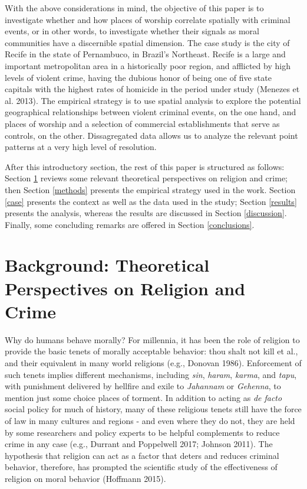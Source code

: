 \documentclass[smallextended]{svjour3}       %
\begin{document}
With the above considerations in mind, the objective of this paper is to
investigate whether and how places of worship correlate spatially with
criminal events, or in other words, to investigate whether their signals
as moral communities have a discernible spatial dimension. The case
study is the city of Recife in the state of Pernambuco, in Brazil's
Northeast. Recife is a large and important metropolitan area in a
historically poor region, and afflicted by high levels of violent crime,
having the dubious honor of being one of five state capitals with the
highest rates of homicide in the period under study (Menezes et al.
2013). The empirical strategy is to use spatial analysis to explore the
potential geographical relationships between violent criminal events, on
the one hand, and places of worship and a selection of commercial
establishments that serve as controls, on the other. Dissagregated data
allows us to analyze the relevant point patterns at a very high level of
resolution.

After this introductory section, the rest of this paper is structured as
follows: Section \ref{background} reviews some relevant theoretical
perspectives on religion and crime; then Section \ref{methods} presents
the empirical strategy used in the work. Section \ref{case} presents the
context as well as the data used in the study; Section \ref{results}
presents the analysis, whereas the results are discussed in Section
\ref{discussion}. Finally, some concluding remarks are offered in
Section \ref{conclusions}.

\hypertarget{background}{%
\section{Background: Theoretical Perspectives on Religion and
Crime}\label{background}}

Why do humans behave morally? For millennia, it has been the role of
religion to provide the basic tenets of morally acceptable behavior:
thou shalt not kill et al., and their equivalent in many world religions
(e.g., Donovan 1986). Enforcement of such tenets implies different
mechanisms, including \emph{sin}, \emph{haram}, \emph{karma}, and
\emph{tapu}, with punishment delivered by hellfire and exile to
\emph{Jahannam} or \emph{Gehenna}, to mention just some choice places of
torment. In addition to acting as \emph{de facto} social policy for much
of history, many of these religious tenets still have the force of law
in many cultures and regions - and even where they do not, they are held
by some researchers and policy experts to be helpful complements to
reduce crime in any case (e.g., Durrant and Poppelwell 2017; Johnson
2011). The hypothesis that religion can act as a factor that deters and
reduces criminal behavior, therefore, has prompted the scientific study
of the effectiveness of religion on moral behavior (Hoffmann 2015).
\end{document}

